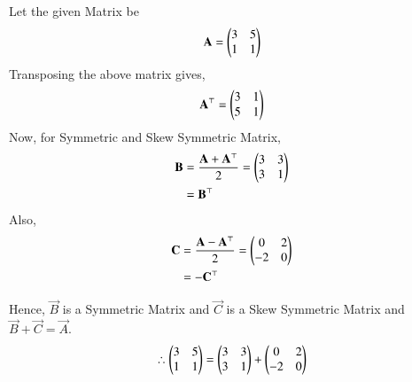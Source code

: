 
Let the given Matrix be
\begin{equation}
\mathbf{A} = \begin{pmatrix}3&5\\1&1\end{pmatrix}
\end{equation}
Transposing the above matrix gives,
\begin{equation}
\mathbf{A}^{\top} = \begin{pmatrix}3&1\\5&1\end{pmatrix}
\end{equation}
Now, for Symmetric and Skew Symmetric Matrix,
\begin{align}
    \mathbf{B} &= \frac{\mathbf{A} + \mathbf{A}^{\top}}{2} = \begin{pmatrix}3&3\\3&1\end{pmatrix} \\
    &= \mathbf{B}^{\top}
\end{align}
Also,
\begin{align}
    \mathbf{C} &= \frac{\mathbf{A} - \mathbf{A}^{\top}}{2} = \begin{pmatrix}0&2\\-2&0\end{pmatrix} \\
    &= -\mathbf{C}^{\top}
\end{align}

Hence, $\vec{B}$ is a Symmetric Matrix and $\vec{C}$ is a Skew Symmetric Matrix and $\vec{B} + \vec{C} = \vec{A}$.
\begin{align}
    \therefore \begin{pmatrix}3&5\\1&1\end{pmatrix} = \begin{pmatrix}3&3\\3&1\end{pmatrix} + \begin{pmatrix}0&2\\-2&0\end{pmatrix}  
\end{align}



